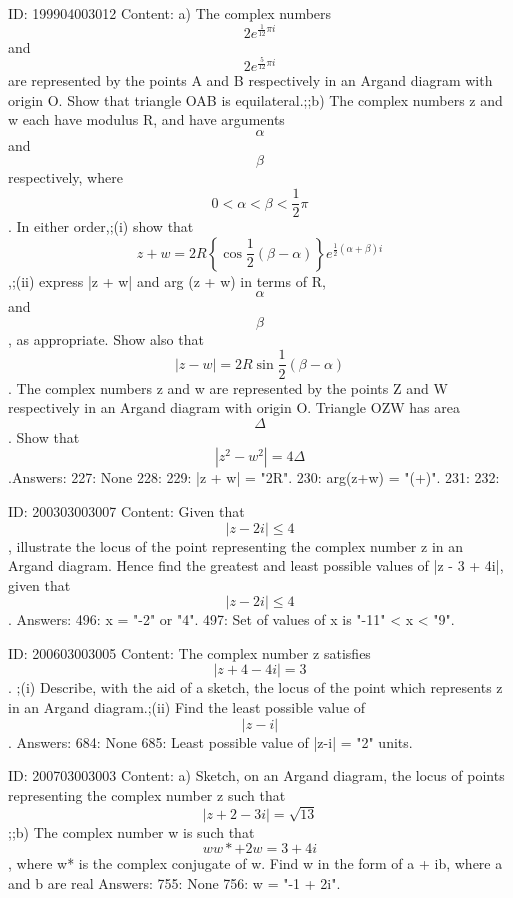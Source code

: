 \documentclass{article}
\begin{document}
ID: 199904003012
Content:
a) The complex numbers \[2e^{\frac {1}{12} \pi i}\] and \[2e^{\frac {5}{12} \pi i}\] are represented by the points A and B respectively in an Argand diagram with origin O. Show that triangle OAB is equilateral.;;b) The complex numbers z and w each have modulus R, and have arguments \[\alpha\] and \[\beta\] respectively, where \[0 < \alpha < \beta < \frac {1}{2} \pi\]. In either order,;(i) show that \[z + w = 2R \left \{ \cos \frac {1}{2} (\beta - \alpha) \right \}e^{\frac {1}{2}(\alpha + \beta)i}\],;(ii) express |z + w| and arg (z + w) in terms of R, \[\alpha\] and \[\beta\], as appropriate. Show also that \[|z - w| = 2R\sin \frac {1}{2}(\beta - \alpha)\]. The complex numbers z and w are represented by the points Z and W respectively in an Argand diagram with origin O. Triangle OZW has area \[\Delta\]. Show that \[|z^2 - w^2| = 4\Delta \].Answers:
227: None
228: 
229: |z + w| = "2R".
230: arg(z+w) = "(\alpha+\beta)".
231: 
232: 

ID: 200303003007
Content:
Given that  $$| z - 2i | \le 4$$, illustrate the locus of the point representing the complex number z in an Argand diagram. Hence find the greatest and least possible values of |z - 3 + 4i|, given that  $$| z - 2i | \le 4$$. Answers:
496: x = "-2" or "4".
497: Set of values of x is "-11" < x < "9".

ID: 200603003005
Content:
The complex number z satisfies $$|z+4-4i|=3$$. ;(i) Describe, with the aid of a sketch, the locus of the point which represents z in an Argand diagram.;(ii) Find the least possible value of $$|z-i|$$ .  Answers:
684: None
685: Least possible value of |z-i| = "2" units.

ID: 200703003003
Content:
a) Sketch, on an Argand diagram, the locus of points representing the complex number z such that $$|z+2-3i|= \sqrt{13} $$ ;;b) The complex number w is such that $$ww*+2w=3+4i$$ , where w* is the complex conjugate of w. Find w in the form of a + ib, where a and b are real Answers:
755: None
756: w = "-1 + 2i".
\end{document}
